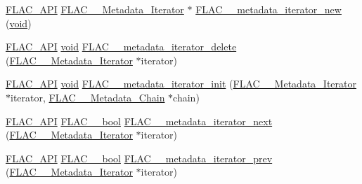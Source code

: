 \begin{DoxyCompactItemize}
\item 
\hyperlink{group__flac__export_ga56ca07df8a23310707732b1c0007d6f5}{F\+L\+A\+C\+\_\+\+A\+PI} \hyperlink{group__flac__metadata__level2_ga9f3e135a07cdef7e51597646aa7b89b2}{F\+L\+A\+C\+\_\+\+\_\+\+Metadata\+\_\+\+Iterator} $\ast$ \hyperlink{group__flac__metadata__level2_gac988906d63bd2ddc910d8f0b118591f7}{F\+L\+A\+C\+\_\+\+\_\+metadata\+\_\+iterator\+\_\+new} (\hyperlink{png_8h_ac9c84fa68bbad002983e35ce3663c686}{void})
\item 
\hyperlink{group__flac__export_ga56ca07df8a23310707732b1c0007d6f5}{F\+L\+A\+C\+\_\+\+A\+PI} \hyperlink{png_8h_ac9c84fa68bbad002983e35ce3663c686}{void} \hyperlink{group__flac__metadata__level2_ga1af713d0ae3f7b761579b4fac64f0a9e}{F\+L\+A\+C\+\_\+\+\_\+metadata\+\_\+iterator\+\_\+delete} (\hyperlink{group__flac__metadata__level2_ga9f3e135a07cdef7e51597646aa7b89b2}{F\+L\+A\+C\+\_\+\+\_\+\+Metadata\+\_\+\+Iterator} $\ast$iterator)
\item 
\hyperlink{group__flac__export_ga56ca07df8a23310707732b1c0007d6f5}{F\+L\+A\+C\+\_\+\+A\+PI} \hyperlink{png_8h_ac9c84fa68bbad002983e35ce3663c686}{void} \hyperlink{group__flac__metadata__level2_ga4a5af69a1f19436b02f738eb8c97c959}{F\+L\+A\+C\+\_\+\+\_\+metadata\+\_\+iterator\+\_\+init} (\hyperlink{group__flac__metadata__level2_ga9f3e135a07cdef7e51597646aa7b89b2}{F\+L\+A\+C\+\_\+\+\_\+\+Metadata\+\_\+\+Iterator} $\ast$iterator, \hyperlink{group__flac__metadata__level2_gaec6993c60b88f222a52af86f8f47bfdf}{F\+L\+A\+C\+\_\+\+\_\+\+Metadata\+\_\+\+Chain} $\ast$chain)
\item 
\hyperlink{group__flac__export_ga56ca07df8a23310707732b1c0007d6f5}{F\+L\+A\+C\+\_\+\+A\+PI} \hyperlink{ordinals_8h_a95103469f1cbd78b8cf250194985b34e}{F\+L\+A\+C\+\_\+\+\_\+bool} \hyperlink{group__flac__metadata__level2_ga3997509ae7eeea3b208700cdbbbd97ed}{F\+L\+A\+C\+\_\+\+\_\+metadata\+\_\+iterator\+\_\+next} (\hyperlink{group__flac__metadata__level2_ga9f3e135a07cdef7e51597646aa7b89b2}{F\+L\+A\+C\+\_\+\+\_\+\+Metadata\+\_\+\+Iterator} $\ast$iterator)
\item 
\hyperlink{group__flac__export_ga56ca07df8a23310707732b1c0007d6f5}{F\+L\+A\+C\+\_\+\+A\+PI} \hyperlink{ordinals_8h_a95103469f1cbd78b8cf250194985b34e}{F\+L\+A\+C\+\_\+\+\_\+bool} \hyperlink{group__flac__metadata__level2_ga003373a88bea6cea2df32f110a95e912}{F\+L\+A\+C\+\_\+\+\_\+metadata\+\_\+iterator\+\_\+prev} (\hyperlink{group__flac__metadata__level2_ga9f3e135a07cdef7e51597646aa7b89b2}{F\+L\+A\+C\+\_\+\+\_\+\+Metadata\+\_\+\+Iterator} $\ast$iterator)
\item 

\end{DoxyCompactItemize}
